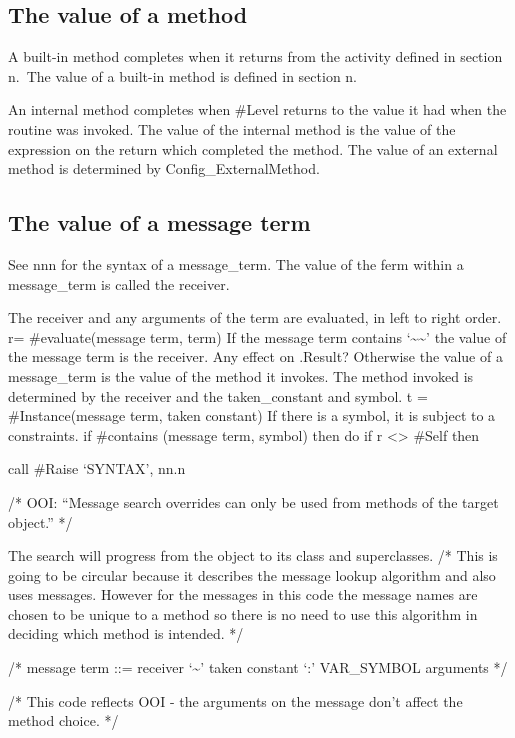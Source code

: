 \subsection{The value of a method}\label{the-value-of-a-method}

A built-in method completes when it returns from the activity defined in
section n.~The value of a built-in method is defined in section n.

An internal method completes when \#Level returns to the value it had
when the routine was invoked. The value of the internal method is the
value of the expression on the return which completed the method. The
value of an external method is determined by Config\_ExternalMethod.

\subsection{The value of a message
term}\label{the-value-of-a-message-term}

See nnn for the syntax of a message\_term. The value of the ferm within
a message\_term is called the receiver.

The receiver and any arguments of the term are evaluated, in left to
right order. r= \#evaluate(message term, term) If the message term
contains `\textasciitilde\textasciitilde{}' the value of the message
term is the receiver. Any effect on .Result? Otherwise the value of a
message\_term is the value of the method it invokes. The method invoked
is determined by the receiver and the taken\_constant and symbol. t =
\#Instance(message term, taken constant) If there is a symbol, it is
subject to a constraints. if \#contains (message term, symbol) then do
if r \textless\textgreater{} \#Self then

call \#Raise `SYNTAX', nn.n

/* OOI: ``Message search overrides can only be used from methods of the
target object.'' */

The search will progress from the object to its class and superclasses.
/* This is going to be circular because it describes the message lookup
algorithm and also uses messages. However for the messages in this code
the message names are chosen to be unique to a method so there is no
need to use this algorithm in deciding which method is intended. */

/* message term ::= receiver `\textasciitilde{}' taken constant `:'
VAR\_SYMBOL arguments */

/* This code reflects OOI - the arguments on the message don't affect
the method choice. */

